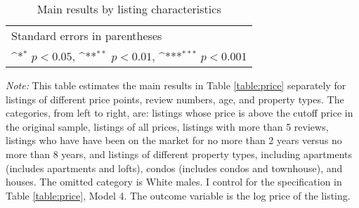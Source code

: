 \begin{landscape}
	\begin{table}[htbp]\centering
		\def\sym#1{\ifmmode^{#1}\else\(^{#1}\)\fi}
		\caption{Main results by listing characteristics}
		\begin{tabular}{l*{8}{c}}
			\hline\hline
			
			\hline\hline
			\multicolumn{9}{l}{\footnotesize Standard errors in parentheses}\\
			\multicolumn{9}{l}{\footnotesize \sym{*} \(p<0.05\), \sym{**} \(p<0.01\), \sym{***} \(p<0.001\)}\\
		\end{tabular}
		\label{table:robustlisting}
		\begin{tablenotes}
			
			\item {\it Note:} This table estimates the main results in Table \ref{table:price} separately for listings of different price points, review numbers, age, and property types. The categories, from left to right, are: listings whose price is above the cutoff price in the original sample, listings of all prices, listings with more than 5 reviews, listings who have have been on the market for no more than 2 years versus no more than 8 years, and listings of different property types, including apartments (includes apartments and lofts), condos (includes condos and townhouse), and houses. The omitted category is White males. I control for the specification in Table \ref{table:price}, Model 4. The outcome variable is the log price of the listing.
			
		\end{tablenotes}
	\end{table}
\end{landscape}



